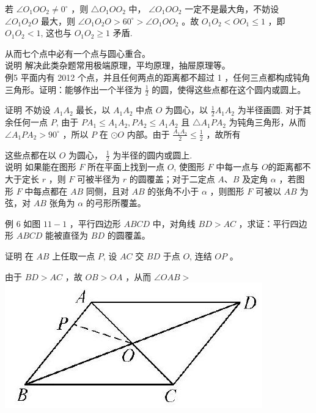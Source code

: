 \documentclass[10pt]{article}
\begin{document}
若 $\angle O_{1} O O_{2} \neq 0^{\circ}$ ，则 $\triangle O_{1} O O_{2}$ 中， $\angle O_{1} O O_{2}$ 一定不是最大角，不妨设 $\angle O_{1} O_{2} O$ 最大，则 $\angle O_{1} O_{2} O>60^{\circ}>\angle O_{1} O O_{2}$ 。故 $O_{1} O_{2}<O O_{1} \leqslant 1$ ，即 $O_{1} O_{2}<1$, 这也与 $O_{1} O_{2} \geqslant 1$ 矛盾.

从而七个点中必有一个点与圆心重合。\\
说明 解决此类杂题常用极端原理，平均原理，抽屉原理等。\\
例5 平面内有 2012 个点，并且任何两点的距离都不超过 1 ，任何三点都构成钝角三角形。证明：能够作出一个半径为 $\frac{1}{2}$ 的圆，使得这些点都在这个圆内或圆上。

证明 不妨设 $A_{1} A_{2}$ 最长，以 $A_{1} A_{2}$ 中点 $O$ 为圆心，以 $\frac{1}{2} A_{1} A_{2}$ 为半径画圆. 对于其余任何一点 $P$, 由于 $P A_{1} \leqslant A_{1} A_{2}, P A_{2} \leqslant A_{1} A_{2}$ 且 $\triangle A_{1} P A_{2}$ 为钝角三角形，从而 $\angle A_{1} P A_{2}>90^{\circ}$ ，所以 $P$ 在 $\odot O$ 内部。由于 $\frac{A_{1} A_{2}}{2} \leqslant \frac{1}{2}$ ，故所有

这些点都在以 $O$ 为圆心， $\frac{1}{2}$ 为半径的圆内或圆上.\\
说明 如果能在图形 $F$ 所在平面上找到一点 $O$, 使图形 $F$ 中每一点与 $O$的距离都不大于定长 $r$ ，则 $F$ 可被半径为 $r$ 的圆覆盖；对于二定点 $A 、 B$ 及定角 $\alpha$ ，若图形 $F$ 中每点都在 $A B$ 同侧，且对 $A B$ 的张角不小于 $\alpha$ ，则图形 $F$ 可被以 $A B$ 为弦，对 $A B$ 张角为 $\alpha$ 的弓形所覆盖。

例 6 如图 $11-1$ ，平行四边形 $A B C D$ 中，对角线 $B D>A C$ ，求证：平行四边形 $A B C D$ 能被直径为 $B D$ 的圆覆盖。

证明 在 $A B$ 上任取一点 $P$, 设 $A C$ 交 $B D$ 于点 $O$, 连结 $O P$ 。

由于 $B D>A C$ ，故 $O B>O A$ ，从而 $\angle O A B>$\\
\includegraphics[max width=\textwidth, center]{2024_10_30_66b8e5e701da2093c133g-082}
\end{document}
